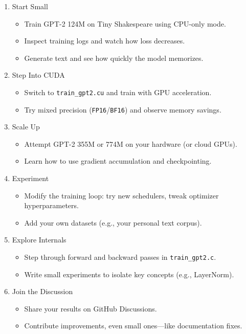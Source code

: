 \documentclass[
  letterpaper,
  DIV=11,
  numbers=noendperiod]{scrreprt}
\providecommand{\tightlist}{%
  \setlength{\itemsep}{0pt}\setlength{\parskip}{0pt}}
\begin{document}
\begin{enumerate}
\def\labelenumi{\arabic{enumi}.}
\item
  Start Small

  \begin{itemize}
  \tightlist
  \item
    Train GPT-2 124M on Tiny Shakespeare using CPU-only mode.
  \item
    Inspect training logs and watch how loss decreases.
  \item
    Generate text and see how quickly the model memorizes.
  \end{itemize}
\item
  Step Into CUDA

  \begin{itemize}
  \tightlist
  \item
    Switch to \texttt{train\_gpt2.cu} and train with GPU acceleration.
  \item
    Try mixed precision (\texttt{FP16}/\texttt{BF16}) and observe memory
    savings.
  \end{itemize}
\item
  Scale Up

  \begin{itemize}
  \tightlist
  \item
    Attempt GPT-2 355M or 774M on your hardware (or cloud GPUs).
  \item
    Learn how to use gradient accumulation and checkpointing.
  \end{itemize}
\item
  Experiment

  \begin{itemize}
  \tightlist
  \item
    Modify the training loop: try new schedulers, tweak optimizer
    hyperparameters.
  \item
    Add your own datasets (e.g., your personal text corpus).
  \end{itemize}
\item
  Explore Internals

  \begin{itemize}
  \tightlist
  \item
    Step through forward and backward passes in \texttt{train\_gpt2.c}.
  \item
    Write small experiments to isolate key concepts (e.g., LayerNorm).
  \end{itemize}
\item
  Join the Discussion

  \begin{itemize}
  \tightlist
  \item
    Share your results on GitHub Discussions.
  \item
    Contribute improvements, even small ones---like documentation fixes.
  \end{itemize}
\end{enumerate}
\end{document}
